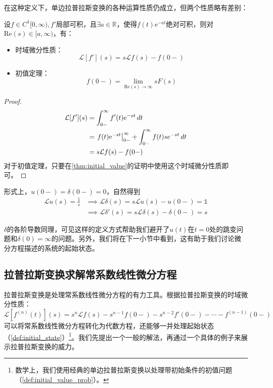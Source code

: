 在这种定义下，单边拉普拉斯变换的各种运算性质仍成立，但两个性质略有差别：
\begin{proposition}[改进的拉普拉斯变换的性质]
    设$f\in C^1[0,\infty),f'$局部可积，且$\exists a\in\mathbb{R}$，使得$f(t)\mathrm{e}^{-at}$绝对可积，则对$\mathrm{Re}(s)\in[a,\infty)$，有：
    \begin{itemize}
        \item 时域微分性质：\[\mathcal{L} [f'](s)=s\mathcal{L} f(s)-f(0-)\]
        \item 初值定理：$$f(0-)=\lim_{\mathrm{Re}(s)\to\infty}sF(s)$$
    \end{itemize}
\end{proposition}
\begin{proof}
    \begin{align*}
        \mathcal{L} [f'](s)&=\int_{0-}^{\infty}f'(t)\mathrm{e}^{-st}\,dt\\
        &=\left.f(t)\mathrm{e}^{-st}\right|_{0-}^{\infty}+\int_{0-}^{\infty}f(t)se^{-st}\,dt\\
        &=s\mathcal{L} f(s)-f(0-)
    \end{align*}
    对于初值定理，只要在\cref{thm:initial_value}的证明中使用这个时域微分性质即可。
\end{proof}

形式上，$u(0-)=\delta(0-)=0$，自然得到
\begin{align*}
    \mathcal{L} u(s)=\frac{1}{s}&\implies\mathcal{L} \delta(s)=s\mathcal{L} u(s)-u(0-)=\mathds{1}\\
    &\implies\mathcal{L} \delta'(s)=s\mathcal{L} \delta(s)-\delta(0-)=s
\end{align*}

$\delta$的各阶导数同理，可见这样的定义方式帮助我们避开了$u(t)$在$t=0$处的跳变问题和$\delta(0)=\infty$的问题。另外，我们将在下一小节中看到，这有助于我们讨论微分方程描述的系统的起始状态。

\subsection{拉普拉斯变换求解常系数线性微分方程}\label{sub:laplace_ODE}
拉普拉斯变换是处理常系数线性微分方程的有力工具。根据拉普拉斯变换的时域微分性质：
\[\mathcal{L}\left[f^{(n)}(t)\right](s)=s^n\mathcal{L} f(s)-s^{n-1}f(0-)-s^{n-2}f'(0-)-\cdots -f^{(n-1)}(0-)\]
可以将常系数线性微分方程转化为代数方程，还能够一并处理起始状态（\cref{def:initial_state}）\footnote{数学上，我们使用经典的单边拉普拉斯变换以处理带初始条件的初值问题（\cref{def:initial_value_prob}）。}。我们先提出一个一般的解法，再通过一个具体的例子来展示拉普拉斯变换的威力。

